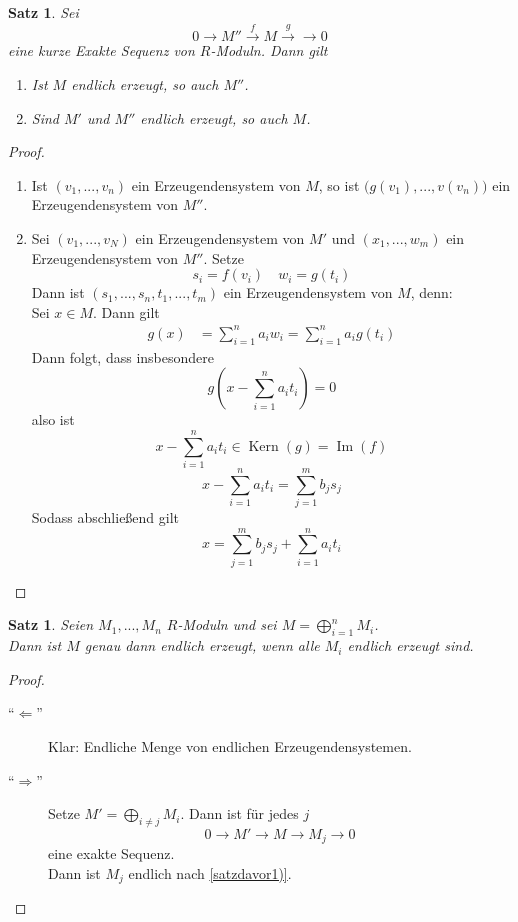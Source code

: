 \documentclass[10pt,a4paper]{article}
\newcommand{\Kern}{\operatorname{Kern}}
\newcommand{\Img}{\operatorname{Im}}
\theoremstyle{plain}
\newtheorem{satz}[theorem]{Satz}
\theoremstyle{definition}
\theoremstyle{remark}
\begin{document}
	\begin{satz}
		Sei
		\[0\to M''\xrightarrow{f}M\xrightarrow{g}\to0\]
		eine kurze Exakte Sequenz von $R$-Moduln. Dann gilt
		\begin{enumerate}
			\item Ist $M$ endlich erzeugt, so auch $M''$.
			\item Sind $M'$ und $M''$ endlich erzeugt, so auch $M$.
		\end{enumerate}
	\end{satz}
	\begin{proof}
		\begin{enumerate}
			\item Ist $(v_1,...,v_n)$ ein Erzeugendensystem von $M$, so ist $\big(g(v_1),...,v(v_n)\big)$ ein Erzeugendensystem von $M''$.
			\item Sei $(v_1,...,v_N)$ ein Erzeugendensystem von $M'$ und $(x_1,...,w_m)$ ein Erzeugendensystem von $M''$. Setze
			\[s_i=f(v_i)\quad w_i=g(t_i)\]
			Dann ist $(s_1,...,s_n,t_1,...,t_m)$ ein Erzeugendensystem von $M$, denn:\\
			Sei $x\in M$. Dann gilt
			\begin{align*}
			g(x)&=\sum_{i=1}^{n}a_iw_i=\sum_{i=1}^{n}a_ig(t_i)
			\end{align*}
			Dann folgt, dass insbesondere
			\[g\left(x-\sum_{i=1}^{n}a_it_i\right)=0\]
			also ist
			\[x-\sum_{i=1}^{n}a_it_i\in\Kern(g)=\Img(f)\]
			\[x-\sum_{i=1}^{n}a_it_i=\sum_{j=1}^{m}b_js_j\]
			Sodass abschließend gilt
			\[x=\sum_{j=1}^{m}b_js_j+\sum_{i=1}^{n}a_it_i\]
		\end{enumerate}
	\end{proof}

	\begin{satz}
		Seien $M_1,...,M_n$ $R$-Moduln und sei $M=\bigoplus_{i=1}^nM_i$. \\
		Dann ist $M$ genau dann endlich erzeugt, wenn alle $M_i$ endlich erzeugt sind.
	\end{satz}
	\begin{proof}
		\begin{description}
			\item[\enquote{$\Leftarrow$}] Klar: Endliche Menge von endlichen Erzeugendensystemen.
			\item[\enquote{$\Rightarrow$}] Setze $M'=\bigoplus_{i\neq j}M_i$. Dann ist für jedes $j$
			\[0\to M'\xrightarrow{ }M\xrightarrow{ }M_j\to0 \]
			eine exakte Sequenz.\\
			Dann ist $M_j$ endlich nach \ref{satzdavor1)}.
		\end{description}
	\end{proof}
\end{document}
